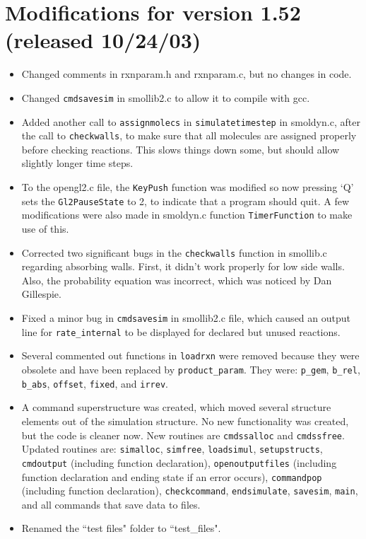 \documentclass {scrbook}
\newcommand {\ttt} {\texttt}
\begin{document}
\section{Modifications for version 1.52 (released 10/24/03)}
\begin{itemize}
\item Changed comments in rxnparam.h and rxnparam.c, but no changes in code.
\item Changed \ttt{cmdsavesim} in smollib2.c to allow it to compile with gcc.
\item Added another call to \ttt{assignmolecs} in \ttt{simulatetimestep} in smoldyn.c, after the call to \ttt{checkwalls}, to make sure that all molecules are assigned properly before checking reactions. This slows things down some, but should allow slightly longer time steps.
\item To the opengl2.c file, the \ttt{KeyPush} function was modified so now pressing `Q' sets the \ttt{Gl2PauseState} to 2, to indicate that a program should quit. A few modifications were also made in smoldyn.c function \ttt{TimerFunction} to make use of this.
\item Corrected two significant bugs in the \ttt{checkwalls} function in smollib.c regarding absorbing walls. First, it didn't work properly for low side walls. Also, the probability equation was incorrect, which was noticed by Dan Gillespie.
\item Fixed a minor bug in \ttt{cmdsavesim} in smollib2.c file, which caused an output line for \ttt{rate\_internal} to be displayed for declared but unused reactions.
\item Several commented out functions in \ttt{loadrxn} were removed because they were obsolete and have been replaced by \ttt{product\_param}. They were: \ttt{p\_gem}, \ttt{b\_rel}, \ttt{b\_abs}, \ttt{offset}, \ttt{fixed}, and \ttt{irrev}.
\item A command superstructure was created, which moved several structure elements out of the simulation structure. No new functionality was created, but the code is cleaner now. New routines are \ttt{cmdssalloc} and \ttt{cmdssfree}. Updated routines are: \ttt{simalloc}, \ttt{simfree}, \ttt{loadsimul}, \ttt{setupstructs}, \ttt{cmdoutput} (including function declaration), \ttt{openoutputfiles} (including function declaration and ending state if an error occurs), \ttt{commandpop} (including function declaration), \ttt{checkcommand}, \ttt{endsimulate}, \ttt{savesim}, \ttt{main}, and all commands that save data to files.
\item Renamed the ``test files" folder to ``test\_files".
\end{itemize}
\end{document}
